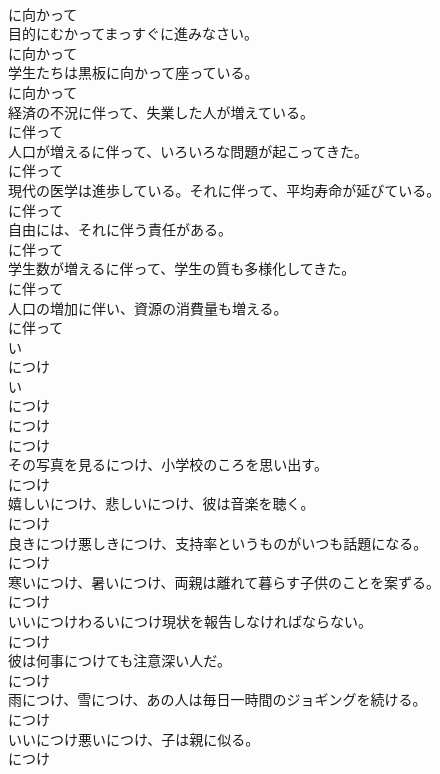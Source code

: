 \documentclass[8pt]{extreport}
\begin{document}
\begin{CJK}{UTF8}{min}
\\	に向かって
\\	目的にむかってまっすぐに進みなさい。	
\\	に向かって
\\	学生たちは黒板に向かって座っている。	
\\	に向かって
\\	経済の不況に伴って、失業した人が増えている。	
\\	に伴って
\\	人口が増えるに伴って、いろいろな問題が起こってきた。	
\\	に伴って
\\	現代の医学は進歩している。それに伴って、平均寿命が延びている。	
\\	に伴って
\\	自由には、それに伴う責任がある。	
\\	に伴って
\\	学生数が増えるに伴って、学生の質も多様化してきた。	
\\	に伴って
\\	人口の増加に伴い、資源の消費量も増える。	
\\	に伴って
\\	い
\\	につけ 
\\	い
\\	につけ 
\\	につけ 
\\	につけ
\\	その写真を見るにつけ、小学校のころを思い出す。	
\\	につけ
\\	嬉しいにつけ、悲しいにつけ、彼は音楽を聴く。	
\\	につけ
\\	良きにつけ悪しきにつけ、支持率というものがいつも話題になる。	
\\	につけ
\\	寒いにつけ、暑いにつけ、両親は離れて暮らす子供のことを案ずる。	
\\	につけ
\\	いいにつけわるいにつけ現状を報告しなければならない。	
\\	につけ
\\	彼は何事につけても注意深い人だ。	
\\	につけ
\\	雨につけ、雪につけ、あの人は毎日一時間のジョギングを続ける。	
\\	につけ
\\	いいにつけ悪いにつけ、子は親に似る。	
\\	につけ

\end{CJK}
\end{document}
